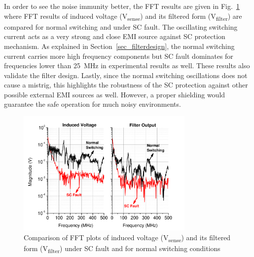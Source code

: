\documentclass[journal]{IEEEtran}
\begin{document}
In order to see the noise immunity better, the FFT results are given in Fig.~\ref{fig_fft_dptvsscpExp} where FFT results of induced voltage (V\textsubscript{sense}) and its filtered form (V\textsubscript{filter}) are compared for normal switching and under SC fault. The oscillating switching current acts as a very strong and close EMI source against SC protection mechanism. As explained in Section~\ref{sec_filterdesign}, the normal switching current carries more high frequency components but SC fault dominates for frequencies lower than 25~MHz in experimental results as well. These results also validate the filter design. Lastly, since the normal switching oscillations does not cause a mistrig, this highlights the robustness of the SC protection against other possible external EMI sources as well. However, a proper shielding would guarantee the safe operation for much noisy environments.

\begin{figure}[]
\centering
\includegraphics[width=3.4in]{Figures/Fig16-FFT_DPTvsSCPExp.pdf}
\caption{Comparison of FFT plots of induced voltage (V\textsubscript{sense}) and its filtered form (V\textsubscript{filter}) under SC fault and for normal switching conditions}
\label{fig_fft_dptvsscpExp}
\end{figure}
\end{document}
